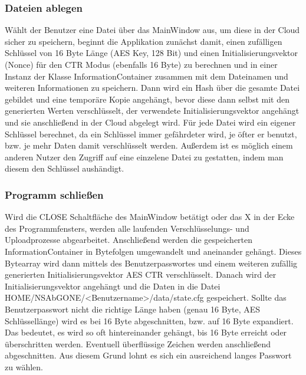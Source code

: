 \documentclass[13pt,a4paper,bibliography=totocnumbered,listof=totocnumbered]{scrartcl}
\begin{document}
\subsubsection{Dateien ablegen}
Wählt der Benutzer eine Datei über das MainWindow aus, um diese in der Cloud sicher zu speichern, beginnt die Applikation zunächst damit, einen zufälligen Schlüssel von 16 Byte Länge (AES Key, 128 Bit) und einen Initialisierungsvektor (Nonce) für den CTR Modus (ebenfalls 16 Byte) zu berechnen und in einer Instanz der Klasse InformationContainer zusammen mit dem Dateinamen und weiteren Informationen zu speichern. Dann wird ein Hash über die gesamte Datei gebildet und eine temporäre Kopie angehängt, bevor diese dann selbst mit den generierten Werten verschlüsselt, der verwendete Initialisierungsvektor angehängt und sie anschließend in der Cloud abgelegt wird. Für jede Datei wird ein eigener Schlüssel berechnet, da ein Schlüssel immer gefährdeter wird, je öfter er benutzt, bzw. je mehr Daten damit verschlüsselt werden. Außerdem ist es möglich einem anderen Nutzer den Zugriff auf eine einzelene Datei zu gestatten, indem man diesem den Schlüssel aushändigt. 
\subsubsection{Programm schließen}
Wird die CLOSE Schaltfläche des MainWindow betätigt oder das X in der Ecke des Programmfensters, werden alle laufenden Verschlüsselungs- und Uploadprozesse abgearbeitet. Anschließend werden die gespeicherten InformationContainer in Bytefolgen umgewandelt und aneinander gehängt. Dieses Bytearray wird dann mittels des Benutzerpasswortes und einem weiteren zufällig generierten Initialisierungsvektor AES CTR verschlüsselt. Danach wird der Initialisierungsvektor angehängt und die Daten in die Datei HOME/NSAbGONE/\textless Benutzername\textgreater/data/state.cfg gespeichert. Sollte das Benutzerpasswort nicht die richtige Länge haben (genau 16 Byte, AES Schlüssellänge) wird es bei 16 Byte abgeschnitten, bzw. auf 16 Byte expandiert. Das bedeutet, es wird so oft hintereinander gehängt, bis 16 Byte erreicht oder überschritten werden. Eventuell überflüssige Zeichen werden anschließend abgeschnitten. Aus diesem Grund lohnt es sich ein ausreichend langes Passwort zu wählen.
\end{document}
